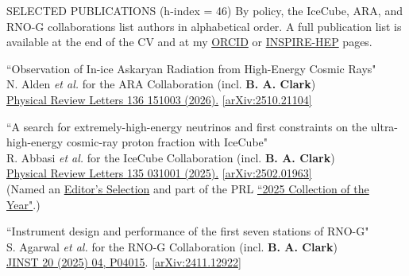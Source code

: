 \documentclass{resume} %
\begin{document}
\begin{rSection}{SELECTED PUBLICATIONS (h-index = 46)}
  By policy, the IceCube, ARA, and RNO-G collaborations list authors in alphabetical order. A full publication list is available at the end of the CV and at my \href{https://orcid.org/0000-0003-4089-2245}{ORCID}  or  \href{https://inspirehep.net/author/profile/Brian.A.Clark.1}{INSPIRE-HEP} pages.

\begin{etaremune}%

\item ``Observation of In-ice Askaryan Radiation from High-Energy Cosmic Rays"\\
N. Alden {\it et al.} for the ARA Collaboration (incl. \textbf{B. A. Clark})\\  \href{https://doi.org/10.1103/xwqy-yzrk}{Physical Review Letters 136 151003 (2026).} \href{https://arxiv.org/abs/2510.21104}{[arXiv:2510.21104]}

  \item ``A search for extremely-high-energy neutrinos and first constraints on the ultra-high-energy cosmic-ray proton fraction with IceCube" \\
R. Abbasi {\it et al.} for the IceCube Collaboration (incl. \textbf{B. A. Clark})\\ \href{https://journals.aps.org/prl/abstract/10.1103/PhysRevLett.135.031001}{Physical Review Letters 135 031001 (2025).} \href{https://arxiv.org/abs/2502.01963}{[arXiv:2502.01963]}\\
(Named an \href{https://physics.aps.org/articles/v18/s96}{Editor's Selection}  and part of the PRL \href{https://promo.aps.org/prl2025}{``2025 Collection of the Year"}.)

\item ``Instrument design and performance of the first seven stations of RNO-G"\\
S. Agarwal {\it et al.} for the RNO-G Collaboration (incl. \textbf{B. A. Clark})\\  \href{https://iopscience.iop.org/article/10.1088/1748-0221/20/04/P04015}{JINST 20 (2025) 04, P04015}. \href{https://arxiv.org/abs/2411.12922}{[arXiv:2411.12922]}


\end{etaremune}
\end{rSection}
\end{document}

